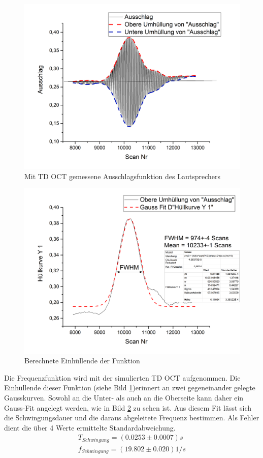 \documentclass[german, %
parskip=full, %
bibliography=totoc, %
]{scrartcl}
\begin{document}
\begin{figure}[ht]
	\centering
	  \includegraphics[width=\textwidth]{TD_OCT_DATA_Einhullende}
	\caption{Mit TD OCT gemessene Ausschlagsfunktion des Lautsprechers}
	\label{fig:Funktion}
\end{figure}
\begin{figure}[ht]
  \centering
	  \includegraphics[width=\textwidth]{TD_OCT_FINAL}
  \caption{Berechnete Einhüllende der Funktion}
	\label{fig:hull}
\end{figure}

Die Frequenzfunktion wird mit der simulierten TD OCT aufgenommen. Die Einhüllende dieser Funktion (siehe Bild \ref{fig:Funktion})erinnert an zwei gegeneinander gelegte Gausskurven. Sowohl an die Unter- als auch an die Oberseite kann daher ein Gauss-Fit angelegt werden, wie in Bild \ref{fig:hull} zu sehen ist. Aus diesem Fit lässt sich die Schwingungsdauer und die daraus abgeleitete Frequenz bestimmen. Als Fehler dient die über 4 Werte ermittelte Standardabweichung.
\begin{align*}
T_{Schwingung} = (0.0253 \pm 0.0007) s \\
f_{Schwingung} = (19.802 \pm 0.020) 1/s
\end{align*}
\end{document}
